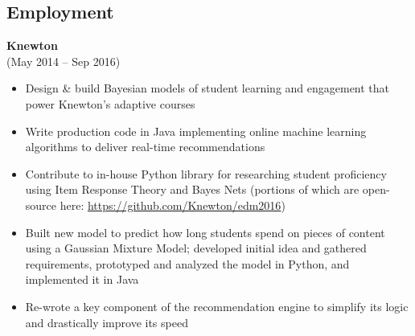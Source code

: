 \documentclass{res}
\begin{document}
 
\setlength{\parskip}{10pt}
\renewcommand{\labelitemi}{\scriptsize$\bullet$} 

\address{\hspace{2pt} (917) 536-7410}
\address{\href{http://maxlivingston.org}{maxlivingston.org}}

\begin{resume} 
  \section{Employment}
  {\bf Knewton} \\ 
   (May 2014 -- Sep 2016)
  \begin{itemize} \itemsep 2.0pt %
  \item Design \& build Bayesian models of student learning and engagement that power Knewton's adaptive courses
  \item Write production code in Java implementing online machine learning algorithms to deliver real-time recommendations
  \item Contribute to in-house Python library for researching student proficiency using Item Response Theory and Bayes Nets (portions of which are open-source here: \href{https://github.com/Knewton/edm2016}{https://github.com/Knewton/edm2016})
  \item Built new model to predict how long students spend on pieces of content using a Gaussian Mixture Model; developed initial idea and gathered requirements, prototyped and analyzed the model in Python, and implemented it in Java
  \item Re-wrote a key component of the recommendation engine to simplify its logic and drastically improve its speed
    
  \end{itemize}


\end{resume}
\end{document}
